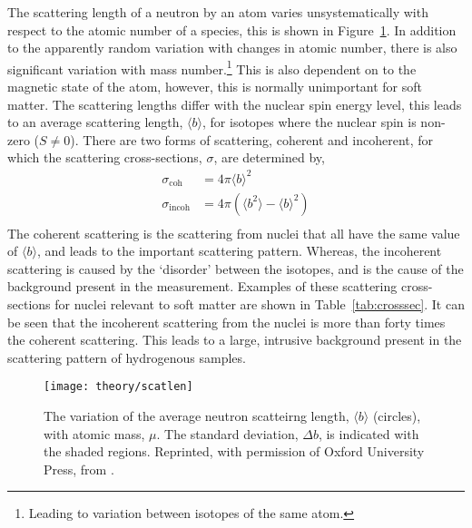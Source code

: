 The scattering length of a neutron by an atom varies unsystematically with respect to the atomic number of a species, this is shown in Figure~\ref{fig:scatlen}.
In addition to the apparently random variation with changes in atomic number, there is also significant variation with mass number.\footnote{Leading to variation between isotopes of the same atom.}
This is also dependent on to the magnetic state of the atom, however, this is normally unimportant for soft matter.
The scattering lengths differ with the nuclear spin energy level, this leads to an average scattering length, $\langle b \rangle$, for isotopes where the nuclear spin is non-zero ($S\neq 0$).
There are two forms of scattering, coherent and incoherent, for which the scattering cross-sections, $\sigma$, are determined by,
%
\begin{equation}
    \begin{aligned}
        \sigma_{\text{coh}} & = 4\pi\langle b \rangle ^2 \\
        \sigma_{\text{incoh}} & = 4\pi(\langle b ^ 2 \rangle - \langle b \rangle ^2) \\
    \end{aligned}
\end{equation}
%
The coherent scattering is the scattering from nuclei that all have the same value of $\langle b \rangle$, and leads to the important scattering pattern.
Whereas, the incoherent scattering is caused by the `disorder' between the isotopes, and is the cause of the background present in the measurement.
Examples of these scattering cross-sections for nuclei relevant to soft matter are shown in Table~\ref{tab:crosssec}.
It can be seen that the incoherent scattering from the  nuclei is more than forty times the coherent scattering.
This leads to a large, intrusive background present in the scattering pattern of hydrogenous samples.
%
\begin{figure}[t]
    \centering
    \texttt{[image: theory/scatlen]}
    \caption{The variation of the average neutron scatteirng length, $\langle b \rangle$ (circles), with atomic mass, $\mu$. The standard deviation, $\Delta b$, is indicated with the shaded regions. Reprinted, with permission of Oxford University Press, from \cite{sivia_elementary_2011}.}
    \label{fig:scatlen}
\end{figure}
%
